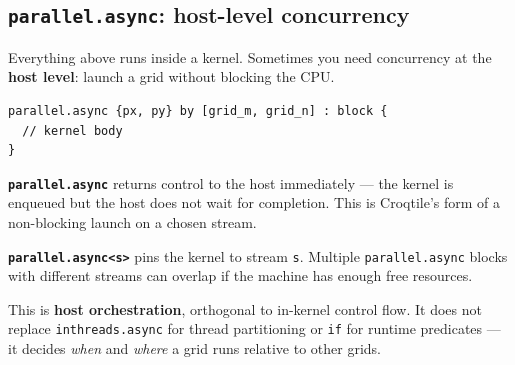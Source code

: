 \subsection*{\texttt{parallel.async}: host-level concurrency}

Everything above runs inside a kernel. Sometimes you need concurrency at the \textbf{host level}: launch a grid without blocking the CPU.

\begin{lstlisting}[language=croqtile,caption={parallel.async: host-level concurrency}]
parallel.async {px, py} by [grid_m, grid_n] : block {
  // kernel body
}
\end{lstlisting}

\textbf{\texttt{parallel.async}} returns control to the host immediately --- the kernel is enqueued but the host does not wait for completion. This is Croqtile's form of a non-blocking launch on a chosen stream.

\textbf{\texttt{parallel.\allowbreak{}async\textless{}s\textgreater{}}} pins the kernel to stream \texttt{s}. Multiple \texttt{parallel.async} blocks with different streams can overlap if the machine has enough free resources.

This is \textbf{host orchestration}, orthogonal to in-kernel control flow. It does not replace \texttt{inthreads.\allowbreak{}async} for thread partitioning or \texttt{if} for runtime predicates --- it decides \emph{when} and \emph{where} a grid runs relative to other grids.
